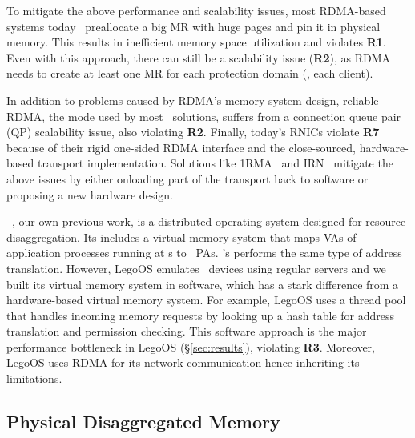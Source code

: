 To mitigate the above performance and scalability issues, most RDMA-based systems today~\cite{FaRM,Tsai17-SOSP} 
preallocate a big MR with huge pages and pin it in physical memory.
This results in inefficient memory space utilization and violates \textbf{R1}.
Even with this approach, there can still be a scalability issue (\textbf{R2}),
as RDMA needs to create at least one MR for each protection domain (\ie, each client).

In addition to problems caused by RDMA's memory system design, reliable RDMA, the mode used by most \md\ solutions, suffers from a connection queue pair (QP) scalability issue, also violating \textbf{R2}.
Finally, today's RNICs violate \textbf{R7} because of their rigid one-sided RDMA interface and the close-sourced, hardware-based transport implementation.
Solutions like 1RMA~\cite{1RMA} and IRN~\cite{IRN} mitigate the above issues by either onloading part of the transport back to software or proposing a new hardware design.

~\cite{Shan18-OSDI}, our own previous work, is a distributed operating system designed for resource disaggregation.
Its \MN{} includes a virtual memory system that maps VAs of application processes running at \CN{}s to \MN\ PAs. \sys's \MN{} performs the same type of address translation.
However, LegoOS emulates \MN\ devices using regular servers and we built its virtual memory system in software,
which has a stark difference from a hardware-based virtual memory system. 
For example, LegoOS uses a thread pool that handles incoming memory requests by looking up a hash table for address translation and permission checking.
This software approach is the major performance bottleneck in LegoOS (\S\ref{sec:results}),
violating \textbf{R3}.
Moreover, LegoOS %
uses RDMA for its network communication hence inheriting its limitations.

\subsection{Physical Disaggregated Memory}
\label{sec:clio:pdm}

